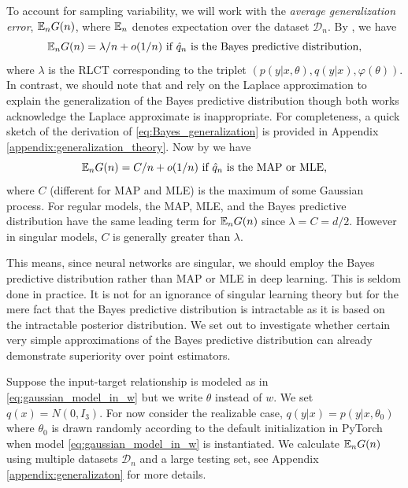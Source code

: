\documentclass{article} %
\begin{document}
To account for sampling variability, we will work with the \textit{average generalization error}, ${\mathbb{E}}_n G(n)$, where ${\mathbb{E}}_n$ denotes expectation over the dataset $\mathcal D_n$.
By {\citet[Theorem 1.2 and Theorem 7.2]{watanabe_algebraic_2009}}, we have
\begin{equation}
{\mathbb{E}}_n G(n) = \lambda/n + o(1/n)  \text{ if $\hat q_n$ is the Bayes predictive distribution,}
\label{eq:Bayes_generalization}
\end{equation}
where $\lambda$ is the RLCT corresponding to the triplet $( p(y|x,\theta), q(y|x), \varphi(\theta) )$. In contrast, we should note that \citet{zhang_energyentropy_2018} and  \citet{le_bayesian_2018} rely on the Laplace approximation to explain the generalization of the Bayes predictive distribution though both works acknowledge the Laplace approximate is inappropriate. For completeness, a quick sketch of the derivation of \eqref{eq:Bayes_generalization} is provided in Appendix \ref{appendix:generalization_theory}.
Now by {\cite[Theorem 6.4]{watanabe_algebraic_2009}} we have
\begin{equation}
{\mathbb{E}}_n G(n) = C/n + o(1/n)   \text{ if $\hat q_n$ is the MAP or MLE,}
\label{eq:map_generalization}
\end{equation}
where $C$ (different for MAP and MLE) is the maximum of some Gaussian process. For regular models, the MAP, MLE, and the Bayes predictive distribution have the same leading term for ${\mathbb{E}}_n G(n)$ since $\lambda = C = d/2$. However in singular models, $C$ is generally greater than $\lambda$. 

This means, since neural networks are singular, we should employ the Bayes predictive distribution rather than MAP or MLE in deep learning. This is seldom done in practice. It is not for an ignorance of singular learning theory but for the mere fact that the Bayes predictive distribution is intractable as it is based on the intractable posterior distribution. 
We set out to investigate whether certain very simple approximations of the Bayes predictive distribution can already demonstrate superiority over point estimators. 

Suppose the input-target relationship is modeled as in \ref{eq:gaussian_model_in_w} but we write $\theta$ instead of $w$.
We set $q(x) = N(0,I_3)$. 
For now consider the realizable case, $q(y|x) = p(y|x,\theta_0)$ where $\theta_0$ is drawn randomly according to the default initialization in PyTorch when model  \ref{eq:gaussian_model_in_w}  is instantiated. We calculate $\mathbb{E}_n G(n)$ using multiple datasets $\mathcal D_n$ and a large testing set, see Appendix \ref{appendix:generalizaton} for more details. 
\end{document}
